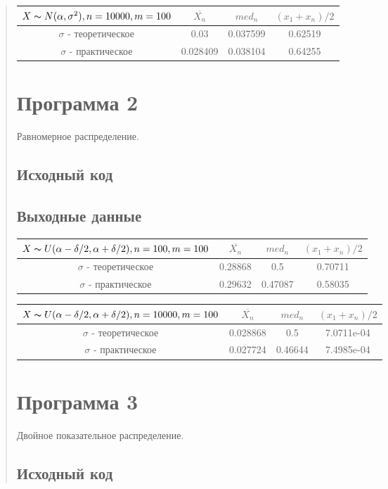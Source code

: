 \documentclass{article}
\begin{document}
\begin{quote}
\begin{tabular}{ | c | c | c | c | }
\hline
$X \thicksim N(\alpha, \sigma^2), n = 10000, m = 100$ & $\overline{X_n}$ & $med_n$ & $(x_1 + x_n) / 2$ \\ \hline
$\sigma$ - теоретическое & 0.03 & 0.037599 & 0.62519 \\ \hline
$\sigma$ - практическое & 0.028409 & 0.038104 & 0.64255 \\
\hline
\end{tabular}
\section{Программа 2}
	Равномерное распределение. \\
\subsection{Исходный код}
	
\subsection{Выходные данные}
\begin{tabular}{ | c | c | c | c | }
\hline
$X \thicksim U(\alpha - \delta / 2, \alpha + \delta / 2), n = 100, m = 100$ & $\overline{X_n}$ & $med_n$ & $(x_1 + x_n) / 2$ \\ \hline
$\sigma$ - теоретическое & 0.28868 & 0.5 & 0.70711 \\ \hline
$\sigma$ - практическое & 0.29632 & 0.47087 & 0.58035 \\
\hline
\end{tabular}

\begin{tabular}{ | c | c | c | c | } 
\hline
$X \thicksim U(\alpha - \delta / 2, \alpha + \delta / 2), n = 10000, m = 100$ & $\overline{X_n}$ & $med_n$ & $(x_1 + x_n) / 2$ \\ \hline
$\sigma$ - теоретическое & 0.028868 & 0.5 & 7.0711e-04 \\ \hline
$\sigma$ - практическое & 0.027724 & 0.46644 & 7.4985e-04 \\
\hline
\end{tabular}
\section{Программа 3}
        Двойное показательное распределение. \\
\subsection{Исходный код}
        

\end{quote}
\end{document}
